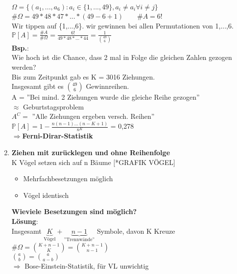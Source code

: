 \begin{enumerate}
	 $\Omega = \{(a_1,...,a_6):a_i \in \{1,...,49\},a_i \neq a_i \forall i \neq j\}$\smallskip\\
	 \#$\Omega = 49*48*47*...*(49-6+1) \qquad \#A = 6! $\medskip\\
	 Wir tippen auf \{1,...,6\}. wir gewinnen bei allen Permutationen von 1,...,6.\\
	 $\mathds{P}[A] = \frac{\#A}{\#\Omega}=\frac{6!}{49*48*...*44} = \frac{1}{\binom{49}{6}}$\medskip\\
	 \textbf{Bsp.}:\\ Wie hoch ist die Chance, dass 2 mal in Folge die gleichen Zahlen gezogen werden?\\
	 Bis zum Zeitpunkt gab es K = 3016 Ziehungen.\\
	 Insgesamt gibt es $\binom{49}{6}$ Gewinnreihen.\\
	 A = ''Bei mind. 2 Ziehungen wurde die gleiche Reihe gezogen''\\$\approx$ Geburtstagsproblem\\
	 $A^C = $ ''Alle Ziehungen ergeben versch. Reihen''\\
	 $\mathds{P}[A] = 1 - \frac{n(n-1)...(n-K+1)}{n^K}$ = 0,278\\
	 $\Rightarrow$\textbf{Ferni-Dirar-Statistik}
	\item \textbf{Ziehen mit zurücklegen und ohne Reihenfolge}\\
	K Vögel setzen sich auf n Bäume [*GRAFIK VÖGEL]
\begin{itemize}
	\item 	Mehrfachbesetzungen möglich
	\item 	Vögel identisch
\end{itemize}
\textbf{Wieviele Besetzungen sind möglich?}\medskip\\
\textbf{Lösung}:\\
Insgesamt $\underbrace{K}_\text{Vögel}+\underbrace{n-1}_\text{''Trennwände''}$ Symbole, davon K Kreuze\medskip\\
\#$\Omega = \binom{K+n-1}{K} = \binom{K+n-1}{n-1} $\medskip\\
$\binom{a}{b} = \binom{a}{a-b}$\smallskip\\
$\Rightarrow$ Bose-Einstein-Statistik, für VL unwichtig
\end{enumerate}

